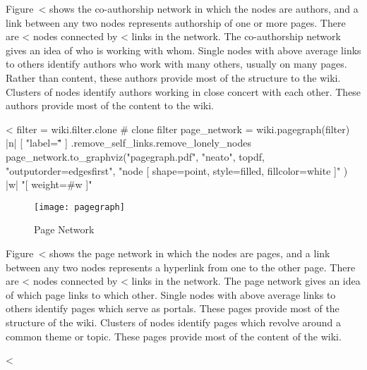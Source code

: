 \documentclass{scrartcl}
\begin{document}
Figure~<%
shows the co-authorship network in which the nodes are authors, and a link between any two nodes represents authorship of one or more pages. There are <%
nodes connected by <%
links in the network. The co-authorship network gives an idea of who is working with whom. Single nodes with above average links to others identify authors who work with many others, usually on many pages. Rather than content, these authors provide most of the structure to the wiki. Clusters of nodes identify authors working in close concert with each other. These authors provide most of the content to the wiki.

<%
filter = wiki.filter.clone # clone filter
page_network = wiki.pagegraph(filter) { |n| [ "label=\"\"" ] }.remove_self_links.remove_lonely_nodes
page_network.to_graphviz("pagegraph.pdf", "neato", topdf, "outputorder=edgesfirst", "node [ shape=point, style=filled, fillcolor=white ]" ) { |w|  "[ weight=#{w} ]" }

\begin{figure}
	\centering
	\texttt{[image: pagegraph]}
	\caption{Page Network}
	\label{fig:page_network}
\end{figure}

Figure~<%
shows the page network in which the nodes are pages, and a link between any two nodes represents a hyperlink from one to the other page. There are <%
nodes connected by <%
links in the network.  The page network gives an idea of which page links to which other. Single nodes with above average links to others identify pages which serve as portals. These pages provide most of the structure of the wiki. Clusters of nodes identify pages which revolve around a common theme or topic. These pages provide most of the content of the wiki.


<%
\end{document}
